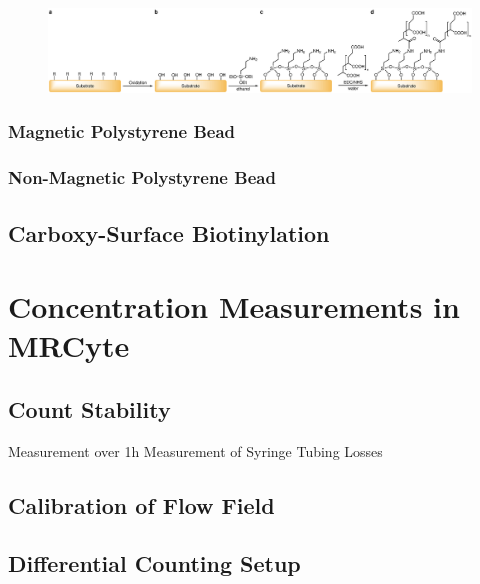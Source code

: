 \begin{figure}[htb!]
	\centering
	\includegraphics[width=1\linewidth]{Ressources/Chemistry/Substrate}
	\label{fig:chem:func:substrate}
\end{figure}



\subsubsection{Magnetic Polystyrene Bead}
\cleardoubleemptypage
\subsubsection{Non-Magnetic Polystyrene Bead}
\cleardoubleemptypage
\subsection{Carboxy-Surface Biotinylation}

\section{Concentration Measurements in MRCyte}

\subsection{Count Stability}
Measurement over 1h
Measurement of Syringe Tubing Losses

\subsection{Calibration of Flow Field}

\subsection{Differential Counting Setup}

